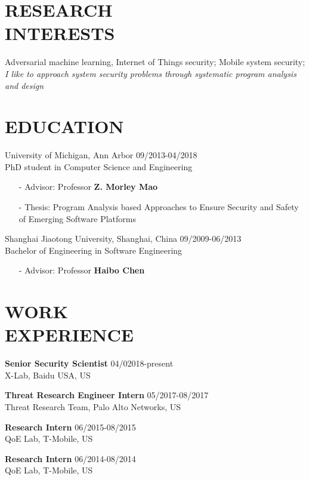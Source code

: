 \documentclass[margin]{res}
\begin{document}
\begin{resume}


\section{RESEARCH \\ INTERESTS}
Adversarial machine learning, Internet of Things security; Mobile system security; \\
\textit{I like to approach system security problems through systematic program analysis and design}

\section{EDUCATION} 
University of Michigan, Ann Arbor \hfill 09/2013-04/2018 \\
PhD student in Computer Science and Engineering
\begin{itemize}
\item[-] Advisor: Professor \textbf{Z. Morley Mao}
\item[-] Thesis: Program Analysis based Approaches to Ensure Security and Safety of Emerging Software Platforms
\end{itemize}

Shanghai Jiaotong University, Shanghai, China \hfill 09/2009-06/2013 \\
Bachelor of Engineering in Software Engineering
\begin{itemize}
\item[-] Advisor: Professor \textbf{Haibo Chen}
\end{itemize}

\section{WORK\\ EXPERIENCE}
\textbf{Senior Security Scientist} \hfill 04/02018-present\\
X-Lab, Baidu USA, US

\textbf{Threat Research Engineer Intern} \hfill 05/2017-08/2017 \\
Threat Research Team, Palo Alto Networks, US

\textbf{Research Intern} \hfill 06/2015-08/2015 \\
QoE Lab, T-Mobile, US

\textbf{Research Intern} \hfill 06/2014-08/2014 \\
QoE Lab, T-Mobile, US


\end{resume}
\end{document}
